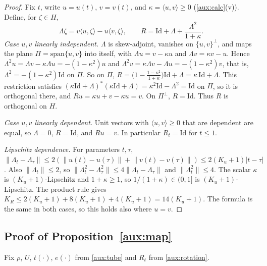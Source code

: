\documentclass[11pt]{article}
\newcommand{\norm}[1]{\lVert #1\rVert}
\newcommand{\ip}[2]{\langle #1,#2\rangle}
\theoremstyle{definition}
\numberwithin{equation}{section}
\begin{document}
\begin{proof}
Fix \(t\), write \(u=u(t)\), \(v=v(t)\), and
\(\kappa=\ip uv\ge0\) (\cref{aux:calc}(v)). Define, for \(\zeta\in H\),
\[
 \Lambda\zeta=v\ip{u}{\zeta}-u\ip{v}{\zeta},
 \qquad R=\mathrm{Id}+\Lambda+\frac{\Lambda^2}{1+\kappa}.
\]
\emph{Case \(u,v\) linearly independent.} \(\Lambda\) is skew-adjoint,
vanishes on \(\{u,v\}^\perp\), and maps the plane \(\Pi=\mathrm{span}\{u,v\}\)
into itself, with \(\Lambda u=v-\kappa u\) and \(\Lambda v=\kappa v-u\). Hence
\(\Lambda^2u=\Lambda v-\kappa\Lambda u=-(1-\kappa^2)u\) and
\(\Lambda^2v=\kappa\Lambda v-\Lambda u=-(1-\kappa^2)v\), that is,
\(\Lambda^2=-(1-\kappa^2)\mathrm{Id}\) on \(\Pi\). So on \(\Pi\),
\(R=\bigl(1-\frac{1-\kappa^2}{1+\kappa}\bigr)\mathrm{Id}+\Lambda
=\kappa\,\mathrm{Id}+\Lambda\). This restriction satisfies
\((\kappa\mathrm{Id}+\Lambda)^*(\kappa\mathrm{Id}+\Lambda)
=\kappa^2\mathrm{Id}-\Lambda^2=\mathrm{Id}\) on \(\Pi\), so it is orthogonal
there, and \(Ru=\kappa u+v-\kappa u=v\). On \(\Pi^\perp\), \(R=\mathrm{Id}\).
Thus \(R\) is orthogonal on \(H\).

\emph{Case \(u,v\) linearly dependent.} Unit vectors with \(\ip uv\ge0\) that
are dependent are equal, so \(\Lambda=0\), \(R=\mathrm{Id}\), and \(Ru=v\). In
particular \(R_t=\mathrm{Id}\) for \(t\le1\).

\emph{Lipschitz dependence.} For parameters \(t,\tau\),
\(\norm{\Lambda_t-\Lambda_\tau}\le2(\norm{u(t)-u(\tau)}+\norm{v(t)-v(\tau)})
\le2(K_u+1)|t-\tau|\). Also \(\norm{\Lambda_t}\le2\), so
\(\norm{\Lambda_t^2-\Lambda_\tau^2}\le4\norm{\Lambda_t-\Lambda_\tau}\) and
\(\norm{\Lambda_t^2}\le4\). The scalar \(\kappa\) is \((K_u+1)\)-Lipschitz
and \(1+\kappa\ge1\), so \(1/(1+\kappa)\in(0,1]\) is
\((K_u+1)\)-Lipschitz. The product rule gives
\(K_R\le2(K_u+1)+8(K_u+1)+4(K_u+1)=14(K_u+1)\). The formula is the same in
both cases, so this holds also where \(u=v\).
\end{proof}

\subsection{Proof of Proposition~\ref{aux:map}}

Fix \(\rho\), \(U\), \(t(\cdot)\), \(e(\cdot)\) from \cref{aux:tube} and
\(R_t\) from \cref{aux:rotation}.
\end{document}
